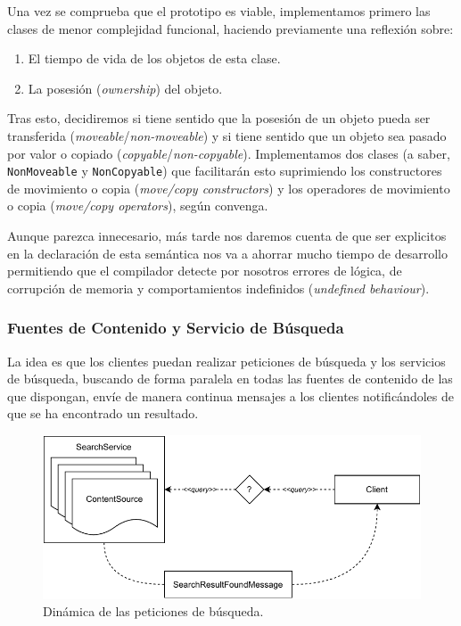 \documentclass[a4paper]{article}
\begin{document}
	Una vez se comprueba que el prototipo es viable, implementamos primero las clases de menor complejidad funcional, haciendo previamente una reflexión sobre:
	\begin{enumerate}
		\item El tiempo de vida de los objetos de esta clase.
		\item La posesión (\textit{ownership}) del objeto.
	\end{enumerate}
	
	Tras esto, decidiremos si tiene sentido que la posesión de un objeto pueda ser transferida (\textit{moveable}/\textit{non-moveable}) y si tiene sentido que un objeto sea pasado por valor o copiado (\textit{copyable}/\textit{non-copyable}). Implementamos dos clases (a saber, \texttt{NonMoveable} y \texttt{NonCopyable}) que facilitarán esto suprimiendo los constructores de movimiento o copia (\textit{move/copy constructors}) y los operadores de movimiento o copia (\textit{move/copy operators}), según convenga.
	
	Aunque parezca innecesario, más tarde nos daremos cuenta de que ser explicitos en la declaración de esta semántica nos va a ahorrar mucho tiempo de desarrollo permitiendo que el compilador detecte por nosotros errores de lógica, de corrupción de memoria y comportamientos indefinidos (\textit{undefined behaviour}).
	
	\subsubsection*{Fuentes de Contenido y Servicio de Búsqueda}
	La idea es que los clientes puedan realizar peticiones de búsqueda y los servicios de búsqueda, buscando de forma paralela en todas las fuentes de contenido de las que dispongan, envíe de manera continua mensajes a los clientes notificándoles de que se ha encontrado un resultado.
	
	\begin{figure}[h]
		\centering
		\includegraphics[scale=0.8]{figures/query_process.pdf}		
		\caption{Dinámica de las peticiones de búsqueda.}
	\end{figure}
	
\end{document}
